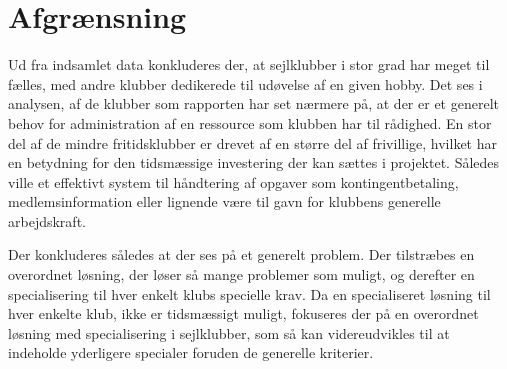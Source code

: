 \section{Afgrænsning}

Ud fra indsamlet data konkluderes der, at sejlklubber i stor grad har meget til fælles, med andre klubber dedikerede til udøvelse af en given hobby. Det ses i analysen, af de klubber som rapporten har set nærmere på, at der er et generelt behov for administration af en ressource som klubben har til rådighed. En stor del af de mindre fritidsklubber er drevet af en større del af frivillige, hvilket har en betydning for den tidsmæssige investering der kan sættes i projektet. Således ville et effektivt system til håndtering af opgaver som kontingentbetaling, medlemsinformation eller lignende være til gavn for klubbens generelle arbejdskraft.

Der konkluderes således at der ses på et generelt problem. Der tilstræbes en overordnet løsning, der løser så mange problemer som muligt, og derefter en specialisering til hver enkelt klubs specielle krav. Da en specialiseret løsning til hver enkelte klub, ikke er tidsmæssigt muligt, fokuseres der på en overordnet løsning med specialisering i sejlklubber, som så kan videreudvikles til at indeholde yderligere specialer foruden de generelle kriterier.

